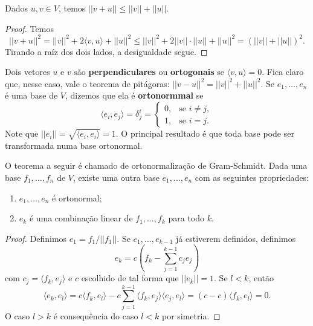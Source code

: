 \begin{theorem}
    Dados $u, v \in V$, temos $||v + u|| \leq ||v|| + ||u||$.
\end{theorem}
\begin{proof}
    Temos \begin{equation}
        ||v + u||^2 = ||v||^2 + 2\langle v, u \rangle + ||u||^2 \leq ||v||^2 + 2||v||\cdot||u|| + ||u||^2 = (||v|| + ||u||)^2.
    \end{equation} Tirando a raíz dos dois lados, a desigualdade segue.
\end{proof}

Dois vetores $u$ e $v$ são \textbf{perpendiculares} ou \textbf{ortogonais} se $\langle v, u \rangle = 0$. Fica claro que, nesse caso, vale o teorema de pitágoras: $||v - u||^2 = ||v||^2 + ||u||^2$. Se $e_1, \dots, e_n$ é uma base de $V$, dizemos que ela é \textbf{ortonormmal} se \begin{equation}
    \langle e_i, e_j \rangle = \delta^i_j = \begin{cases}
        0, &\text{se } i \neq j, \\ 1, &\text{se } i = j.
    \end{cases}
\end{equation} Note que $||e_i|| = \sqrt{\langle e_i, e_i \rangle} = 1$. O principal resultado é que toda base pode ser transformada numa base ortonormal.

\begin{theorem}
    O teorema a seguir é chamado de ortonormalização de Gram-Schmidt. Dada uma base $f_1, \dots, f_n$ de $V$, existe uma outra base $e_1, \dots, e_n$ com as seguintes propriedades: \begin{enumerate}
        \item $e_1, \dots, e_n$ é ortonormal;
        \item $e_k$ é uma combinação linear de $f_1, \dots, f_k$ para todo $k$.
    \end{enumerate}
\end{theorem}
\begin{proof}
    Definimos $e_1 = f_1/||f_1||$. Se $e_1, \dots, e_{k-1}$ já estiverem definidos, definimos \begin{equation}
        e_k = c\left(f_k - \sum_{j = 1}^{k-1} c_j e_j\right)
    \end{equation} com $c_j = \langle f_k, e_j \rangle$ e $c$ escolhido de tal forma que $||e_k|| = 1$. Se $l < k$, então \begin{equation}
        \langle e_k, e_l \rangle = c\langle f_k, e_l \rangle - c\sum_{j = 1}^{k - 1} \langle f_k, e_j \rangle \langle e_j, e_l \rangle = (c - c)\langle f_k, e_l \rangle = 0.
    \end{equation} O caso $l > k$ é consequência do caso $l < k$ por simetria.
\end{proof}

